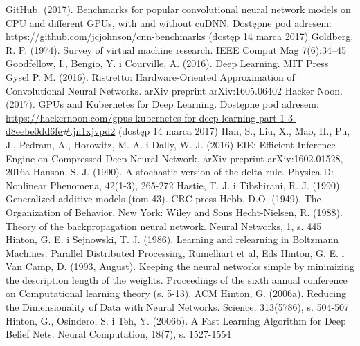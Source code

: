 \documentclass[12pt,a4paper,twoside]{article}
\begin{document}
\begin{thebibliography}{99}
 GitHub. (2017). Benchmarks for popular convolutional neural network models on CPU and different GPUs, with and without cuDNN. Dostępne pod adresem: \url{https://github.com/jcjohnson/cnn-benchmarks} (dostęp 14 marca 2017)
 Goldberg, R. P. (1974). Survey of virtual machine research. IEEE Comput Mag 7(6):34–45
 Goodfellow, I., Bengio, Y. i Courville, A. (2016). Deep Learning. MIT Press
 Gysel P. M. (2016). Ristretto: Hardware-Oriented Approximation of Convolutional Neural Networks. arXiv preprint arXiv:1605.06402
 Hacker Noon. (2017). GPUs and Kubernetes for Deep Learning. Dostępne pod adresem: \url{https://hackernoon.com/gpus-kubernetes-for-deep-learning-part-1-3-d8eebe0dd6fe#.jn1xjvpd2} (dostęp 14 marca 2017)
 Han, S., Liu, X., Mao, H., Pu, J., Pedram, A., Horowitz, M. A. i Dally, W. J. (2016) EIE: Efficient Inference Engine on Compressed Deep Neural Network. arXiv preprint arXiv:1602.01528, 2016a
 Hanson, S. J. (1990). A stochastic version of the delta rule. Physica D: Nonlinear Phenomena, 42(1-3), 265-272
 Hastie, T. J. i Tibshirani, R. J. (1990). Generalized additive models (tom 43). CRC press
 Hebb, D.O. (1949). The Organization of Behavior. New York: Wiley and Sons
 Hecht-Nielsen, R. (1988). Theory of the backpropagation neural network. Neural Networks, 1, s. 445
 Hinton, G. E. i Sejnowski, T. J. (1986). Learning and relearning in Boltzmann Machines. Parallel Distributed Processing, Rumelhart et al, Eds
 Hinton, G. E. i Van Camp, D. (1993, August). Keeping the neural networks simple by minimizing the description length of the weights. Proceedings of the sixth annual conference on Computational learning theory (s. 5-13). ACM
 Hinton, G. (2006a). Reducing the Dimensionality of Data with Neural Networks. Science, 313(5786), s. 504-507
 Hinton, G., Osindero, S. i Teh, Y. (2006b). A Fast Learning Algorithm for Deep Belief Nets. Neural Computation, 18(7), s. 1527-1554

\end{thebibliography}
\end{document}
